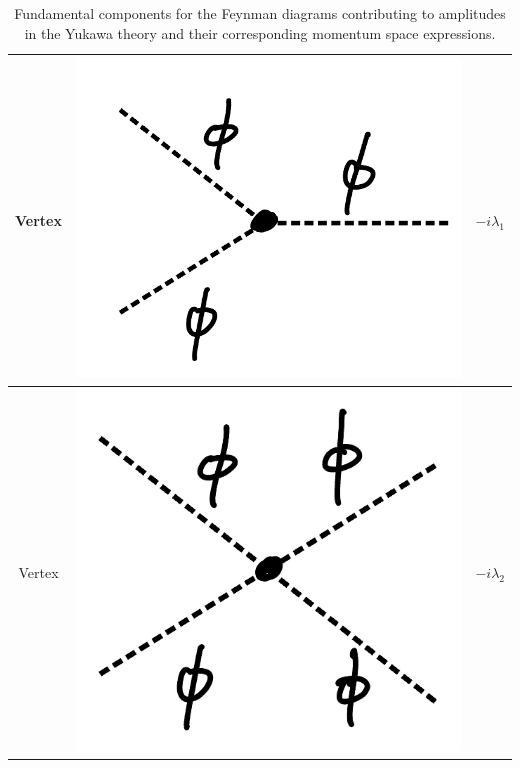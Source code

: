 {\begin{table}[h!tb]
\begin{tabular}{|c|c|c|}
    \hline
    Vertex & \includegraphics[width=0.2\linewidth]{Y_int2.jpeg} & $- i \lambda_1$ \\
    \hline
    Vertex & \includegraphics[width=0.2\linewidth]{Y_int3.jpeg} & $- i \lambda_2$ \\
    \hline
\end{tabular}
\caption{Fundamental components for the Feynman diagrams contributing to amplitudes in the Yukawa theory and their corresponding momentum space expressions.}
\label{tab:Feynman-rules-Y}
\end{table}


}
